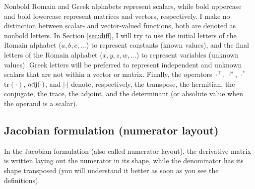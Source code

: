 \documentclass{article}
\newcommand{\trans}{\top}
\newcommand{\hermit}{\mathsf{H}}
\newcommand\abs[1]{\left\lvert#1\right\rvert}
\begin{document}
Nonbold Romain and Greek alphabets represent scalars, while bold uppercase and bold lowercase represent matrices and vectors, respectively. I make no distinction between scalar- and vector-valued functions, both are denoted as nonbold letters. In Section \ref{sec:diff}, I will try to use the initial letters of the Romain alphabet (\(a, b, c, \dots\)) to represent constants (known values), and the final letters of the Romain alphabet (\(x, y, z, w, \dots\)) to represent variables (unknown values). Greek letters will be preferred to represent independent and unknown scalars that are not within a vector or matrix. Finally, the operators \(\cdot^{\trans}\), \(\cdot^{\hermit}\), \(\cdot^*\) \(\text{tr}(\cdot)\), \(\textnormal{adj}(\cdot)\), and \(\abs{\cdot}\) denote, respectively, the transpose, the hermitian, the conjugate, the trace, the adjoint, and the determinant (or absolute value when the operand is a scalar).

\subsection{Jacobian formulation (numerator layout)}

In the Jacobian formulation (also called numerator layout), the derivative matrix is written laying out the numerator in its shape, while the denominator has its shape transposed (you will understand it better as soon as you see the definitions).
\end{document}
